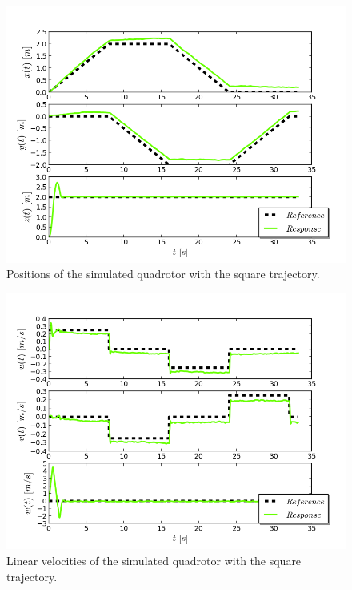 \begin{figure}[H]
\centering
\includegraphics[scale=0.7]{Images/Chapter5/ardrone/T2/position.png}
\caption{Positions of the simulated quadrotor with the square trajectory.}
\label{fig:ardrone_sq_pos}
\end{figure}

\begin{figure}[H]
\centering
\includegraphics[scale=0.7]{Images/Chapter5/ardrone/T2/velocity.png}
\caption{Linear velocities of the simulated quadrotor with the square trajectory.}
\label{fig:ardrone_sq_vel}
\end{figure}


